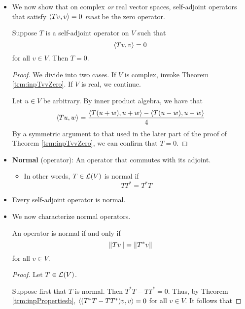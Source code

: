 \documentclass[../main.tex]{subfiles}
\begin{document}
\begin{itemize}
\begin{theorem}
    \end{theorem}
    \item We now show that on complex \emph{or} real vector spaces, self-adjoint operators that satisfy $\left\langle{Tv},{v}\right\rangle=0$ \emph{must} be the zero operator.
    \begin{theorem}\label{trm:selfAdjointTvv}
        Suppose $T$ is a self-adjoint operator on $V$ such that
        \begin{equation*}
            \left\langle{Tv},{v}\right\rangle = 0
        \end{equation*}
        for all $v\in V$. Then $T=0$.
        \begin{proof}
            We divide into two cases. If $V$ is complex, invoke Theorem \ref{trm:inpTvvZero}. If $V$ is real, we continue.\par
            Let $u\in V$ be arbitrary. By inner product algebra, we have that
            \begin{equation*}
                \left\langle{Tu},{w}\right\rangle = \frac{\left\langle{T(u+w)},{u+w}\right\rangle-\left\langle{T(u-w)},{u-w}\right\rangle}{4}
            \end{equation*}
            By a symmetric argument to that used in the later part of the proof of Theorem \ref{trm:inpTvvZero}, we can confirm that $T=0$.
        \end{proof}
    \end{theorem}
    \item \textbf{Normal} (operator): An operator that commutes with its adjoint.
    \begin{itemize}
        \item In other words, $T\in\mathcal{L}(V)$ is normal if
        \begin{equation*}
            TT^* = T^*T
        \end{equation*}
    \end{itemize}
    \item Every self-adjoint operator is normal.
    \item We now characterize normal operators.
    \begin{theorem}\label{trm:normalNorm}
        An operator is normal if and only if
        \begin{equation*}
            \norm{Tv} = \norm{T^*v}
        \end{equation*}
        for all $v\in V$.
        \begin{proof}
            Let $T\in\mathcal{L}(V)$.\par
            Suppose first that $T$ is normal. Then $T^*T-TT^*=0$. Thus, by Theorem \ref{trm:inpPropertiesb}, $\left\langle{(T^*T-TT^*)v},{v}\right\rangle=0$ for all $v\in V$. It follows that

\end{proof}
\end{theorem}
\end{itemize}
\end{document}
